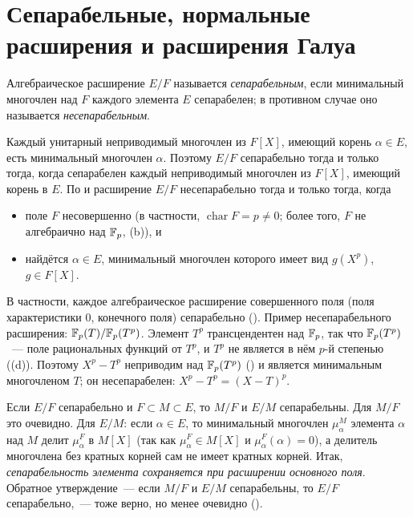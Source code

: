 \makeatletter
{}
\makeatother
\section{Сепарабельные, нормальные расширения и расширения Галуа}

\begin{definition}[3.6]
Алгебраическое расширение $E/F$ называется \emph{сепарабельным}, если минимальный многочлен над $F$ каждого элемента
$E$ сепарабелен; в противном случае оно называется \emph{несепарабельным}.
\end{definition}

Каждый унитарный неприводимый многочлен из $F[X]$, имеющий корень $\alpha\in E$, есть минимальный многочлен $\alpha$.
Поэтому $E/F$ сепарабельно тогда и только тогда, когда сепарабелен каждый неприводимый многочлен из $F[X]$, имеющий
корень в $E$. По  и  расширение $E/F$ несепарабельно тогда и только тогда, когда
\begin{itemize}
\item поле $F$ несовершенно (в частности, $\operatorname{char}F=p\ne0$; более того, $F$ не алгебраично над $\mathbb F_p$,
(b)), и
\item найдётся $\alpha\in E$, минимальный многочлен которого имеет вид $g(X^p)$, $g\in F[X]$.
\end{itemize}
В частности, каждое алгебраическое расширение совершенного поля (поля характеристики $0$, конечного поля)
сепарабельно (). Пример несепарабельного расширения: $\mathbb F_p(T)/\mathbb F_p(T^p)$. Элемент $T^p$ трансцендентен над
$\mathbb F_p$, так что $\mathbb F_p(T^p)$~--- поле рациональных функций от $T^p$, и $T^p$ не является в нём $p$-й степенью
((d)). Поэтому $X^p-T^p$ неприводим над $\mathbb F_p(T^p)$ () и является минимальным многочленом $T$; он
несепарабелен: $X^p-T^p=(X-T)^p$.

\begin{remark}[3.6a]
Если $E/F$ сепарабельно и $F\subset M\subset E$, то $M/F$ и $E/M$ сепарабельны. Для $M/F$ это очевидно. Для $E/M$: если
$\alpha\in E$, то минимальный многочлен $\mu^M_\alpha$ элемента $\alpha$ над $M$ делит $\mu^F_\alpha$ в $M[X]$ (так как
$\mu^F_\alpha\in M[X]$ и $\mu^F_\alpha(\alpha)=0$), а делитель многочлена без кратных корней сам не имеет кратных корней.
Итак, \emph{сепарабельность элемента сохраняется при расширении основного поля}. Обратное утверждение~--- если
$M/F$ и $E/M$ сепарабельны, то $E/F$ сепарабельно,~--- тоже верно, но менее очевидно ().
\end{remark}

